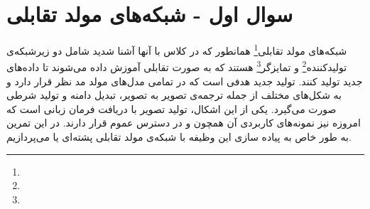 \section{سوال اول - شبکه‌های مولد تقابلی}
شبکه‌های مولد تقابلی\footnote{} همانطور که در کلاس با آنها آشنا شدید شامل دو زیرشبکه‌ی تولیدکننده\footnote{} و تمایزگر\footnote{} هستند که به صورت تقابلی آموزش داده می‌شوند تا داده‌های جدید تولید کنند. تولید جدید هدفی است که در تمامی مدل‌های مولد مد نظر قرار دارد و به شکل‌های مختلف از جمله ترجمه‌ی تصویر به تصویر، تبدیل دامنه و تولید شرطی صورت می‌گیرد. یکی از این اشکال، تولید تصویر با دریافت فرمان زبانی است که امروزه نیز نمونه‌های کاربردی آن همچون  و  در دسترس عموم قرار دارند. در این تمرین به طور خاص به پیاده سازی این وظیفه با شبکه‌ی مولد تقابلی پشته‌ای یا  می‌پردازیم.



